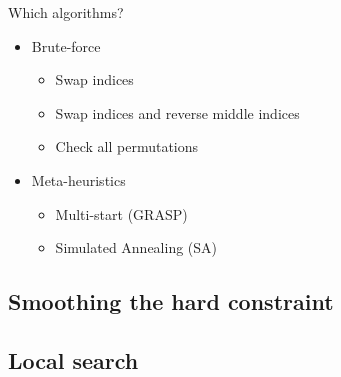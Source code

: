 Which algorithms?
\begin{itemize}
	\item Brute-force
	\begin{itemize}
		\item Swap indices
		\item Swap indices and reverse middle indices
		\item Check all permutations
	\end{itemize}
	\item Meta-heuristics
	\begin{itemize}
		\item Multi-start (GRASP)
		\item Simulated Annealing (SA)
	\end{itemize}
\end{itemize}

%
%


\subsection{Smoothing the hard constraint}






\cleardoublepage
\subsection{Local search}\label{subsc:local-search}

